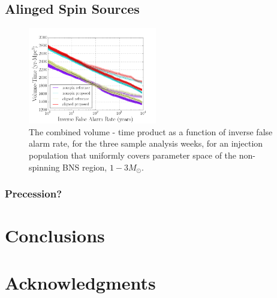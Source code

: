 \subsection{Alinged Spin Sources}

\begin{figure}
\includegraphics[width=0.5\textwidth]{papers/bns_o1_dev/figures/aligned_combined.png}
\caption{\label{fig:aligned} 
The combined volume - time product as a function of inverse false alarm rate, for the
three sample analysis weeks, for an injection population that uniformly covers parameter space of the non-spinning BNS region, $1- 3M_\odot$. 
}
\end{figure}


\subsubsection{Precession?}


\section{Conclusions}
\label{sec:conclusions}

\section{Acknowledgments}
\label{sec:acknowledgments}
